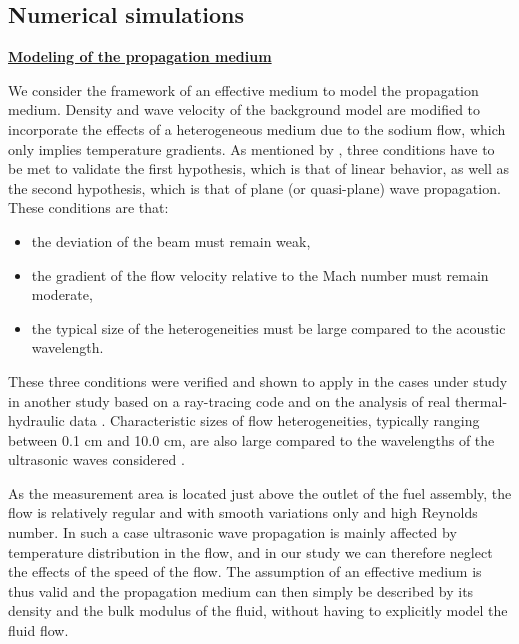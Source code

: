     \subsection{Numerical simulations} \label{ssec:2dgrf_num}

        \underline{\textbf{Modeling of the propagation medium}}

            We consider the framework of an effective medium to model the propagation medium. Density and wave velocity of the background model are modified to
incorporate the effects of a heterogeneous medium due to the sodium flow, which only implies temperature gradients.
As mentioned by \cite{Godin2002Aneffectivequiescent},
three conditions have to be met to validate the first hypothesis, which is that of linear behavior, as well as the second hypothesis,
which is that of plane (or quasi-plane) wave propagation. These conditions are that:
\vspace*{-4mm}
            \begin{itemize}
                \item the deviation of the beam must remain weak,
                \item the gradient of the flow velocity relative to the Mach number must remain moderate,
                \item the typical size of the heterogeneities must be large compared to the acoustic wavelength.
            \end{itemize}
\vspace*{-4mm}
            These three conditions were verified and shown to apply in the cases under study in another study based on a ray-tracing code
\parencite{Massacret2014Modellingofultrasonic} and on the analysis of real thermal-hydraulic data \parencite{Tenchine2010Somethermalhydraulic}. Characteristic
sizes of flow heterogeneities, typically ranging between 0.1 cm and 10.0 cm, are also large compared to the wavelengths of the ultrasonic waves considered
\parencite{Grewal1982Watersimulationof}.

            As the measurement area is located just above the outlet of the fuel assembly, the flow is relatively regular and with smooth variations only and
high Reynolds number. In such a case ultrasonic wave propagation is mainly affected by temperature distribution in the flow, and in our study we can therefore
neglect the effects of the speed of the flow. The assumption of an effective medium is thus valid and the propagation medium can then simply be described by
its density and the bulk modulus of the fluid, without having to explicitly model the fluid flow.

